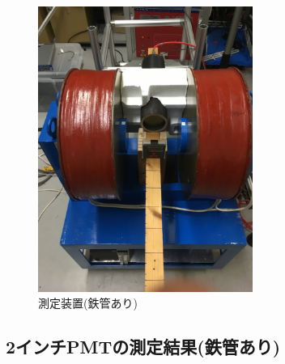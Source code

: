 \begin{figure}[h]
	\centering
		\includegraphics[width=7cm]{fig/iguchi/2inchinFe.jpg}
	\caption{測定装置(鉄管あり)}
	\label{2inchinFe}
\end{figure}




\subsection{2インチPMTの測定結果(鉄管あり)}

